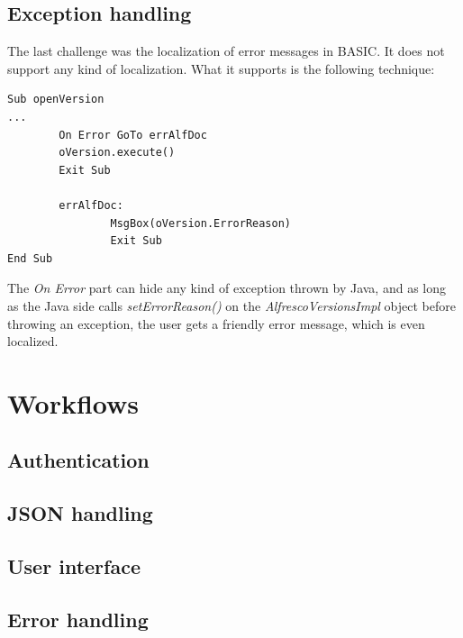 \subsection{Exception handling}

The last challenge was the localization of error messages in BASIC. It does not
support any kind of localization. What it supports is the following technique:

\begin{lstlisting}
Sub openVersion
...
        On Error GoTo errAlfDoc
        oVersion.execute()
        Exit Sub

        errAlfDoc:
                MsgBox(oVersion.ErrorReason)
                Exit Sub
End Sub
\end{lstlisting}

The \emph{On Error} part can hide any kind of exception thrown by Java, and as
long as the Java side calls \emph{setErrorReason()} on the
\emph{AlfrescoVersionsImpl} object before throwing an exception, the user gets
a friendly error message, which is even localized.

\section{Workflows}

\subsection{Authentication}

\subsection{JSON handling}

\subsection{User interface}

\subsection{Error handling}
